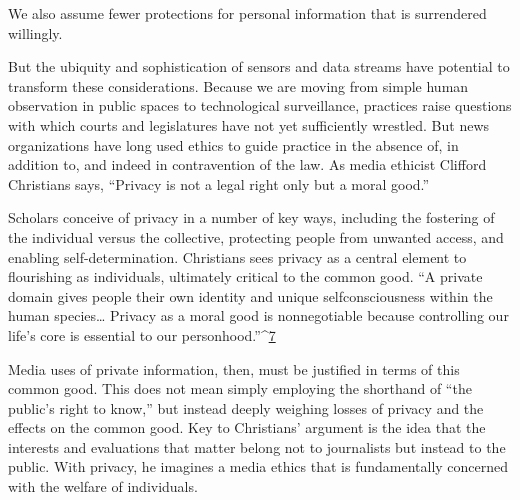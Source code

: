 We also assume fewer protections for personal information that is surrendered
willingly.

But the ubiquity and sophistication of sensors and data streams have potential
to transform these considerations. Because we are moving from simple
human observation in public spaces to technological surveillance, practices
raise questions with which courts and legislatures have not yet sufficiently
wrestled. But news organizations have long used ethics to guide practice in
the absence of, in addition to, and indeed in contravention of the law. As
media ethicist Clifford Christians says, ``Privacy is not a legal right only but
a moral good.''

Scholars conceive of privacy in a number of key ways, including the fostering
of the individual versus the collective, protecting people from unwanted
access, and enabling self-determination. Christians sees privacy as a central
element to flourishing as individuals, ultimately critical to the common
good. ``A private domain gives people their own identity and unique selfconsciousness
within the human species… Privacy as a moral good is nonnegotiable
because controlling our life's core is essential to our personhood.''^{\href{#endnotes-culver}{7}}

Media uses of private information, then, must be justified in terms of this
common good. This does not mean simply employing the shorthand of ``the
public's right to know,'' but instead deeply weighing losses of privacy and
the effects on the common good. Key to Christians' argument is the idea
that the interests and evaluations that matter belong not to journalists but
instead to the public. With privacy, he imagines a media ethics that is fundamentally
concerned with the welfare of individuals.


